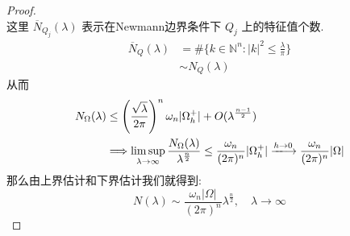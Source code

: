 \documentclass[11pt]{ctexart}[UTF8]
\begin{document}
\begin{proof}
\begin{equation*}
    \end{equation*}
    这里 $\overline{N}_{Q_j}(\lambda)$ 表示在Newmann边界条件下 $Q_j$ 上的特征值个数.
    \begin{equation*}
        \begin{aligned}
            \overline{N}_{Q}(\lambda) &= \# \{ k \in \mathbb{N}^n : |k|^2 \leq \frac{\lambda}{\pi} \} \\
                                        &\sim N_{Q}(\lambda)
        \end{aligned}
    \end{equation*}
    从而
    \begin{equation*}
        \begin{aligned}
            N_{\Omega}(\lambda) &\leq \left( \frac{\sqrt{\lambda}}{2\pi} \right)^{n}\omega_n |\Omega_{h}^{+}| + O(\lambda^{\frac{n-1}{2}}) \\
                                &\Longrightarrow \limsup\limits_{\lambda \to \infty} \frac{N_{\Omega}(\lambda)}{\lambda^{\frac{n}{2}}} \leq \frac{\omega_n}{(2\pi)^n} |\Omega_{h}^{+}| \xlongrightarrow{h \to 0} \frac{\omega_n}{(2\pi)^n} |\Omega|
        \end{aligned}
    \end{equation*}
    那么由上界估计和下界估计我们就得到:
    \begin{equation*}
        N(\lambda) \sim \frac{\omega_n |\Omega|}{(2\pi)^n} \lambda^{\frac{n}{2}}, \quad \lambda \to \infty
    \end{equation*}
\end{proof}
\end{document}
